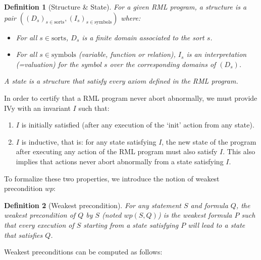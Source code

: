 \documentclass[11pt,a4paper,oldfontcommands,openany]{memoir}
\newtheorem*{definition}{Definition}
\begin{document}
    \begin{definition}[Structure \& State]
        For a given RML program, a structure is a pair \(((D_s)_{s\in \text{sorts}}, (I_s)_{s\in \text{symbols}})\) where:
        \begin{itemize}
            \item For all \(s \in \text{sorts}\), \(D_s\) is a finite domain associated to the sort \(s\).
            \item For all \(s \in \text{symbols}\) (variable, function or relation), \(I_s\) is an interpretation (=valuation) for the symbol \(s\) over the corresponding domains of \((D_s)\).
        \end{itemize}
        A state is a structure that satisfy every axiom defined in the RML program.
    \end{definition}

    In order to certify that a RML program never abort abnormally, we must provide IVy with an invariant \(I\) such that:
    \begin{enumerate}
        \item \(I\) is initially satisfied (after any execution of the `init' action from any state).
        \item \(I\) is inductive, that is: for any state satisfying \(I\), the new state of the program after executing any action of the RML program must also satisfy \(I\).
        This also implies that actions never abort abnormally from a state satisfying \(I\).
    \end{enumerate}

    To formalize these two properties, we introduce the notion of weakest precondition \(wp\):
    \begin{definition}[Weakest precondition]
        For any statement \(S\) and formula \(Q\), the weakest precondition of \(Q\) by \(S\) (noted \(wp(S,Q)\)) is the weakest formula \(P\) such that
        every execution of \(S\) starting from a state satisfying \(P\) will lead to a state that satisfies \(Q\).
    \end{definition}

    Weakest preconditions can be computed as follows:\\
\end{document}
